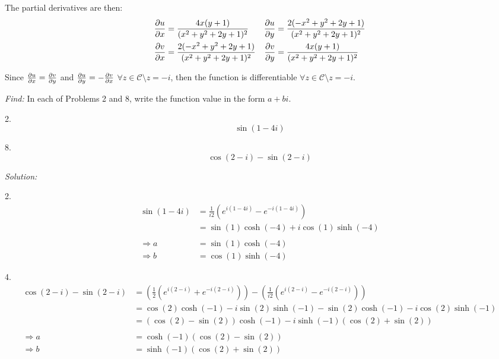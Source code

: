 \documentclass[11pt]{homework}
\begin{document}
The partial derivatives are then:
\begin{align*}
  \pdv{u}{x} &= \frac{4x(y+1)}{(x^2+y^2+2y+1)^2}           & \pdv{u}{y} &= \frac{2(-x^2 + y^2 +2y+1)}{(x^2+y^2+2y+1)^2} \\
  \pdv{v}{x} &=  \frac{2(-x^2+y^2+2y+1)}{(x^2+y^2+2y+1)^2} & \pdv{v}{y} &= \frac{4x(y+1)}{(x^2+y^2+2y+1)^2}
\end{align*}

Since $\pdv{u}{x}=\pdv{v}{y}$ and $\pdv{u}{y}=-\pdv{v}{x}$ 
$\forall z \in \mathcal{C} \setminus z = -i$,
then the function is differentiable $ \forall z \in \mathcal{C} \setminus z=-i$.

\newpage
{}
\emph{Find:}
\newline
In each of Problems 2 and 8,
write the function value in the form
$a+bi$.

2.
\begin{equation*}
  \sin (1-4i)
\end{equation*}

8.
\begin{equation*}
  \cos (2-i) - \sin ( 2-i)
\end{equation*}

\emph{Solution:}
\newline

2.
\begin{align*}
\sin (1-4i) &= \frac{1}{i2} \left( e^{i(1-4i)} - e^{-i(1-4i)}\right) \\
  &= \sin(1) \cosh(-4) + i \cos(1) \sinh(-4) \\
  \\
\Rightarrow
  a &= \sin(1)\cosh(-4) \\
\Rightarrow
  b &= \cos(1)\sinh(-4)
\end{align*}

4. 
\begin{align*}
\cos(2-i) - \sin(2-i) 
  &= 
    \left( 
      \frac{1}{2} \left( e^{i(2-i)} + e^{-i(2- i)}\right)
    \right)
    -
    \left( 
      \frac{1}{i2} \left( e^{i(2-i)} - e^{-i(2- i)}\right)
    \right) \\
  &= 
    \cos(2)\cosh(-1) - i \sin(2)\sinh(-1)
    -
    \sin(2)\cosh(-1) - i\cos(2)\sinh(-1)  \\
  &=
    \left(
      \cos(2) - \sin(2)
    \right) \cosh(-1)
    -i
    \sinh(-1)
    \left( 
      \cos(2) + \sin(2)
    \right) \\
  \\
\Rightarrow 
  a &= \cosh(-1) \left( \cos(2) - \sin(2) \right)  \\
\Rightarrow 
  b &= \sinh(-1) \left( \cos(2) + \sin(2) \right) 
\end{align*}
\end{document}
